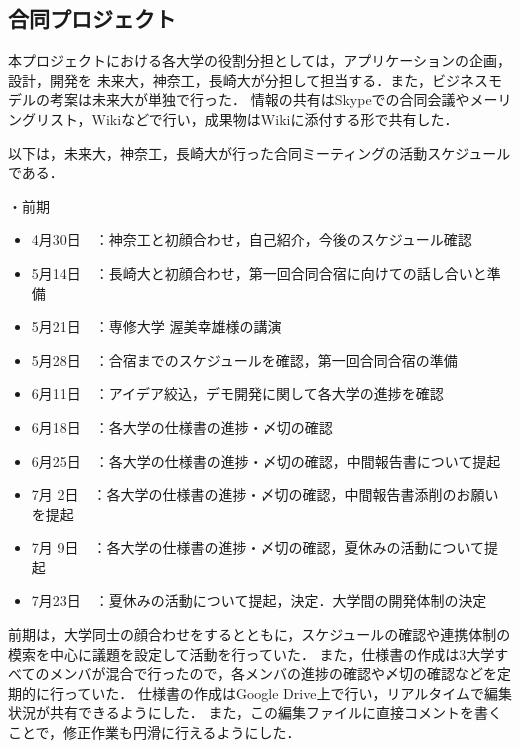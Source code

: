\subsection{合同プロジェクト}
\par
本プロジェクトにおける各大学の役割分担としては，アプリケーションの企画，設計，開発を
未来大，神奈工，長崎大が分担して担当する．また，ビジネスモデルの考案は未来大が単独で行った．
情報の共有はSkypeでの合同会議やメーリングリスト，Wikiなどで行い，成果物はWikiに添付する形で共有した．

\par
以下は，未来大，神奈工，長崎大が行った合同ミーティングの活動スケジュールである．
\par
・前期
\begin{itemize}
\item 4月30日　：神奈工と初顔合わせ，自己紹介，今後のスケジュール確認
\item 5月14日　：長崎大と初顔合わせ，第一回合同合宿に向けての話し合いと準備
\item 5月21日　：専修大学 渥美幸雄様の講演
\item 5月28日　：合宿までのスケジュールを確認，第一回合同合宿の準備
\item 6月11日　：アイデア絞込，デモ開発に関して各大学の進捗を確認
\item 6月18日　：各大学の仕様書の進捗・〆切の確認
\item 6月25日　：各大学の仕様書の進捗・〆切の確認，中間報告書について提起
\item 7月 2日　：各大学の仕様書の進捗・〆切の確認，中間報告書添削のお願いを提起
\item 7月 9日　：各大学の仕様書の進捗・〆切の確認，夏休みの活動について提起
\item 7月23日　：夏休みの活動について提起，決定．大学間の開発体制の決定
\end{itemize}

前期は，大学同士の顔合わせをするとともに，スケジュールの確認や連携体制の模索を中心に議題を設定して活動を行っていた．
また，仕様書の作成は3大学すべてのメンバが混合で行ったので，各メンバの進捗の確認や〆切の確認などを定期的に行っていた．
仕様書の作成はGoogle Drive上で行い，リアルタイムで編集状況が共有できるようにした．
また，この編集ファイルに直接コメントを書くことで，修正作業も円滑に行えるようにした．

